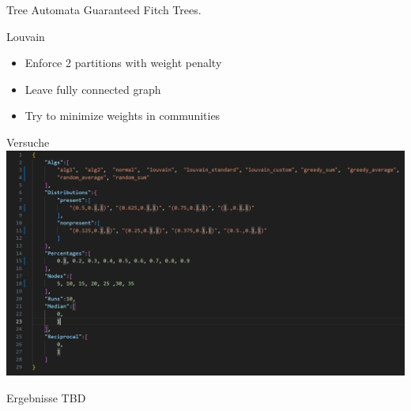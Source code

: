 \documentclass{beamer}
\begin{document}
\begin{frame}{Tree Automata}
    Guaranteed Fitch Trees.
\end{frame}

\begin{frame}{Louvain}
    \begin{itemize}
        \item Enforce 2 partitions with weight penalty
        \item Leave fully connected graph
        \item Try to minimize weights in communities
    \end{itemize}
\end{frame}

\begin{frame}{Versuche}
    \includegraphics[width=\textwidth]{Capture.PNG}
\end{frame}

\begin{frame}{Ergebnisse}
TBD
\end{frame}
\end{document}
